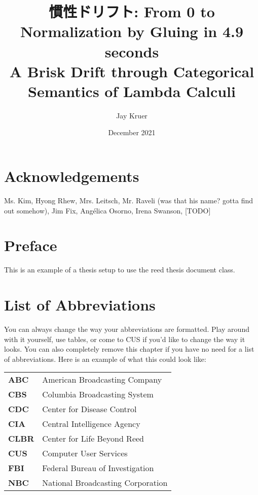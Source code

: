 \documentclass[12pt,twoside]{reedthesis}
\title{慣性ドリフト: From 0 to Normalization by Gluing in 4.9 seconds\\ A Brisk Drift through Categorical Semantics of Lambda Calculi}
\author{Jay Kruer}
\date{December 2021}
\begin{document}
\maketitle
\frontmatter %
\pagestyle{empty} %

\chapter*{Acknowledgements}
Ms. Kim, Hyong Rhew, Mrs. Leitsch, Mr. Raveli (was that his name? gotta find out
somehow), Jim Fix, Ang\'elica Osorno, Irena Swanson, [TODO]

\chapter*{Preface}
This is an example of a thesis setup to use the reed thesis document class.



\chapter*{List of Abbreviations}
You can always change the way your abbreviations are formatted. Play around with it yourself, use tables, or come to CUS if you'd like to change the way it looks. You can also completely remove this chapter if you have no need for a list of abbreviations. Here is an example of what this could look like:

\begin{table}[h]
  \centering %
  \begin{tabular}{ll}
    \textbf{ABC}  	&  American Broadcasting Company \\
    \textbf{CBS}  	&  Columbia Broadcasting System\\
    \textbf{CDC}  	&  Center for Disease Control \\
    \textbf{CIA}  	&  Central Intelligence Agency\\
    \textbf{CLBR} 	&  Center for Life Beyond Reed\\
    \textbf{CUS}  	&  Computer User Services\\
    \textbf{FBI}  	&  Federal Bureau of Investigation\\
    \textbf{NBC}  	&  National Broadcasting Corporation\\
  \end{tabular}
\end{table}
\end{document}
